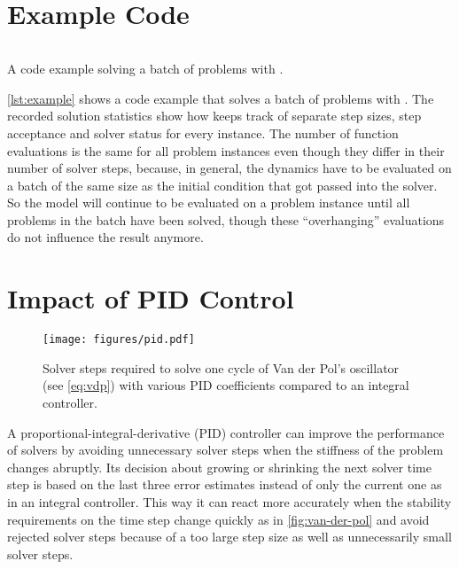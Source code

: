 \documentclass{article}
\begin{document}
\section{Example Code}\label{sec:code}

\begin{listing}
  \inputminted{python}{example.py}
  \caption{A code example solving a batch of \vdp{} problems with \torchode{}.}\label{lst:example}
\end{listing}

\cref{lst:example} shows a code example that solves a batch of \vdp{} problems with \torchode{}. The recorded solution statistics show how \torchode{} keeps track of separate step sizes, step acceptance and solver status for every instance. The number of function evaluations is the same for all problem instances even though they differ in their number of solver steps, because, in general, the dynamics have to be evaluated on a batch of the same size as the initial condition that got passed into the solver. So the model will continue to be evaluated on a problem instance until all problems in the batch have been solved, though these ``overhanging'' evaluations do not influence the result anymore.

\section{Impact of PID Control}\label{sec:pid}

\begin{figure}[h]
  \centering
  \texttt{[image: figures/pid.pdf]}
  \caption{Solver steps required to solve one cycle of Van der Pol's oscillator (see \cref{eq:vdp}) with various PID coefficients compared to an integral controller.}\label{fig:pid}
\end{figure}
\vspace{1em}

A proportional-integral-derivative (PID) controller \citep{soderlind2002automatic,soderlind2003digital} can improve the performance of \ODE{} solvers by avoiding unnecessary solver steps when the stiffness of the problem changes abruptly. Its decision about growing or shrinking the next solver time step is based on the last three error estimates instead of only the current one as in an integral controller. This way it can react more accurately when the stability requirements on the time step change quickly as in \cref{fig:van-der-pol} and avoid rejected solver steps because of a too large step size as well as unnecessarily small solver steps.
\end{document}
